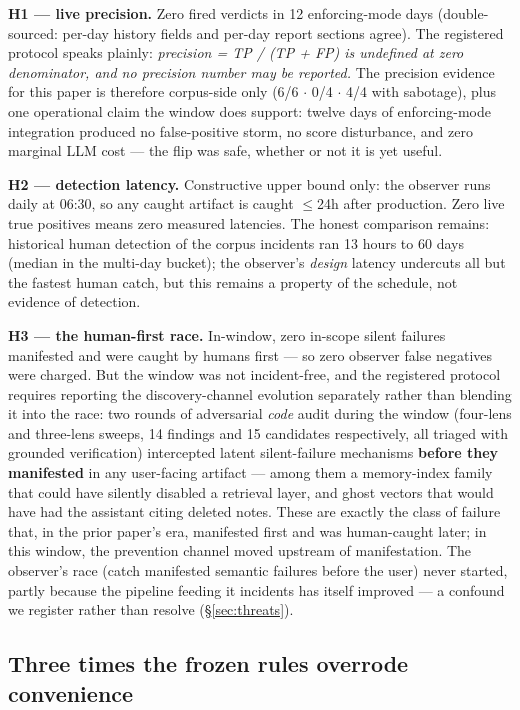\documentclass[11pt]{article}
\begin{document}
\textbf{H1 --- live precision.} Zero fired verdicts in 12
enforcing-mode days (double-sourced: per-day history fields and per-day
report sections agree). The registered protocol speaks plainly:
\emph{precision = TP / (TP + FP) is undefined at zero denominator, and
no precision number may be reported.} The precision evidence for this
paper is therefore corpus-side only (6/6 $\cdot$ 0/4 $\cdot$ 4/4 with
sabotage), plus one operational claim the window does support: twelve
days of enforcing-mode integration produced no false-positive storm, no
score disturbance, and zero marginal LLM cost --- the flip was safe,
whether or not it is yet useful.

\textbf{H2 --- detection latency.} Constructive upper bound only: the
observer runs daily at 06:30, so any caught artifact is caught
$\leq$24h after production. Zero live true positives means zero
measured latencies. The honest comparison remains: historical human
detection of the corpus incidents ran 13 hours to 60 days (median in
the multi-day bucket); the observer's \emph{design} latency undercuts
all but the fastest human catch, but this remains a property of the
schedule, not evidence of detection.

\textbf{H3 --- the human-first race.} In-window, zero in-scope silent
failures manifested and were caught by humans first --- so zero
observer false negatives were charged. But the window was not
incident-free, and the registered protocol requires reporting the
discovery-channel evolution separately rather than blending it into the
race: two rounds of adversarial \emph{code} audit during the window
(four-lens and three-lens sweeps, 14 findings and 15 candidates
respectively, all triaged with grounded verification) intercepted
latent silent-failure mechanisms \textbf{before they manifested} in any
user-facing artifact --- among them a memory-index family that could
have silently disabled a retrieval layer, and ghost vectors that would
have had the assistant citing deleted notes. These are exactly the
class of failure that, in the prior paper's era, manifested first and
was human-caught later; in this window, the prevention channel moved
upstream of manifestation. The observer's race (catch manifested
semantic failures before the user) never started, partly because the
pipeline feeding it incidents has itself improved --- a confound we
register rather than resolve (\S\ref{sec:threats}).

\subsection{Three times the frozen rules overrode convenience}
\label{sec:overrides}
\end{document}
